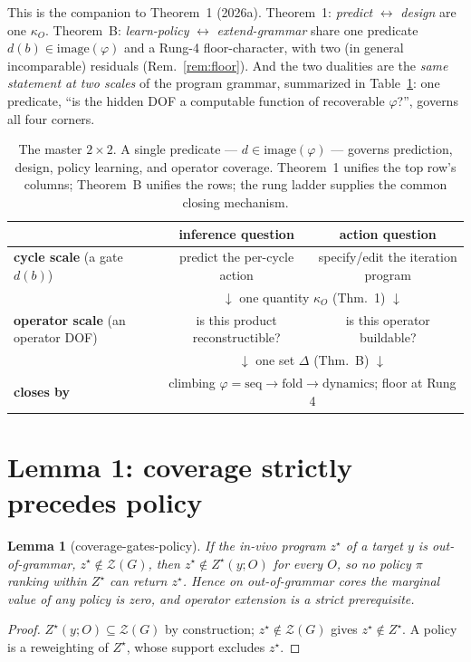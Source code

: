\documentclass[11pt]{article}
\theoremstyle{plain}
\newtheorem{lemma}{Lemma}
\theoremstyle{definition}
\newcommand{\Zstar}{Z^{\star}}
\newcommand{\kO}{\kappa_{O}}
\begin{document}
\noindent This is the companion to Theorem~1 (2026a). Theorem~1: \emph{predict} $\leftrightarrow$ \emph{design} are one $\kO$. Theorem~B: \emph{learn-policy} $\leftrightarrow$ \emph{extend-grammar} share one predicate $d(b)\in\mathrm{image}(\varphi)$ and a Rung-4 floor-character, with two (in general incomparable) residuals (Rem.~\ref{rem:floor}). And the two dualities are the \emph{same statement at two scales} of the program grammar, summarized in Table~\ref{tab:master}: one predicate, ``is the hidden DOF a computable function of recoverable $\varphi$?'', governs all four corners.

\begin{table}[h]
\centering
\small
\begin{tabular}{l|cc}
 & \textbf{inference question} & \textbf{action question}\\\hline
\textbf{cycle scale} (a gate $d(b)$) & predict the per-cycle action & specify/edit the iteration program\\
 & \multicolumn{2}{c}{$\downarrow$ one quantity $\kO$ (Thm.~1) $\downarrow$}\\[2pt]
\textbf{operator scale} (an operator DOF) & is this product reconstructible? & is this operator buildable?\\
 & \multicolumn{2}{c}{$\downarrow$ one set $\Delta$ (Thm.~B) $\downarrow$}\\\hline
\textbf{closes by} & \multicolumn{2}{c}{climbing $\varphi=\text{seq}\to\text{fold}\to\text{dynamics}$; floor at Rung 4}
\end{tabular}
\caption{The master $2\times 2$. A single predicate --- $d\in\mathrm{image}(\varphi)$ --- governs prediction, design, policy learning, and operator coverage. Theorem~1 unifies the top row's columns; Theorem~B unifies the rows; the rung ladder supplies the common closing mechanism.}
\label{tab:master}
\end{table}

\section{Lemma 1: coverage strictly precedes policy}
\label{sec:order}
\begin{lemma}[coverage-gates-policy]\label{lem:order}
If the in-vivo program $z^\star$ of a target $y$ is out-of-grammar, $z^\star\notin\mathcal{Z}(G)$, then $z^\star\notin\Zstar(y;O)$ for every $O$, so no policy $\pi$ ranking within $\Zstar$ can return $z^\star$. Hence on out-of-grammar cores the marginal value of any policy is zero, and operator extension is a strict prerequisite.
\end{lemma}
\begin{proof}
$\Zstar(y;O)\subseteq\mathcal{Z}(G)$ by construction; $z^\star\notin\mathcal{Z}(G)$ gives $z^\star\notin\Zstar$. A policy is a reweighting of $\Zstar$, whose support excludes $z^\star$.
\end{proof}
\end{document}
